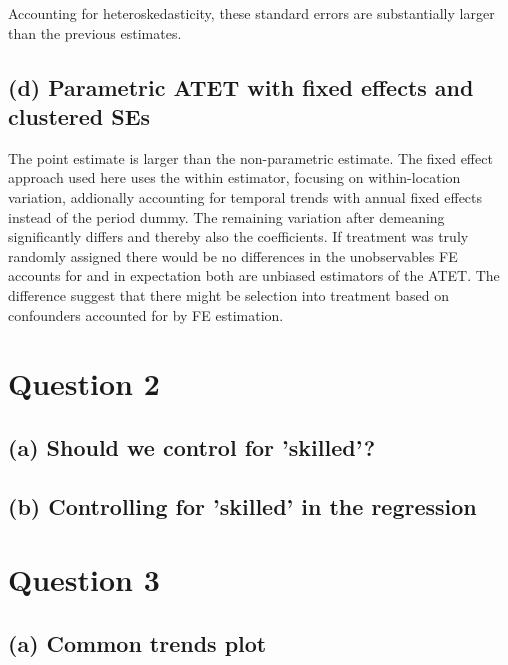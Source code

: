 \documentclass{scrartcl}
\begin{document}
Accounting for heteroskedasticity, these standard errors are substantially larger than the previous estimates.

\subsection*{(d) Parametric ATET with fixed effects and clustered SEs}

The point estimate is larger than the non-parametric estimate. The fixed effect approach used here uses the within estimator, focusing on within-location variation, addionally accounting for temporal trends with annual fixed effects instead of the period dummy. The remaining variation after demeaning significantly differs and thereby also the coefficients. If treatment was truly randomly assigned there would be no differences in the unobservables FE accounts for and in expectation both are unbiased estimators of the ATET. The difference suggest that there might be selection into treatment based on confounders accounted for by FE estimation.

\section*{Question 2}

\subsection*{(a) Should we control for 'skilled'?}


\subsection*{(b) Controlling for 'skilled' in the regression}




\section*{Question 3}

\subsection*{(a) Common trends plot}
\end{document}

